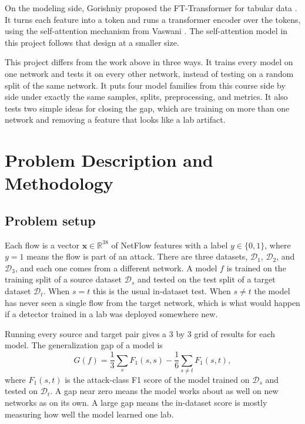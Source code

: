 On the modeling side, Gorishniy \etal proposed the FT-Transformer for tabular data \cite{gorishniy2021}. It turns each feature into a token and runs a transformer encoder over the tokens, using the self-attention mechanism from Vaswani \etal \cite{vaswani2017}. The self-attention model in this project follows that design at a smaller size.

This project differs from the work above in three ways. It trains every model on one network and tests it on every other network, instead of testing on a random split of the same network. It puts four model families from this course side by side under exactly the same samples, splits, preprocessing, and metrics. It also tests two simple ideas for closing the gap, which are training on more than one network and removing a feature that looks like a lab artifact.

\section{Problem Description and Methodology}
\label{sec:method}

\subsection{Problem setup}

Each flow is a vector $\mathbf{x} \in \mathbb{R}^{38}$ of NetFlow features with a label $y \in \{0, 1\}$, where $y = 1$ means the flow is part of an attack. There are three datasets, $\mathcal{D}_1$, $\mathcal{D}_2$, and $\mathcal{D}_3$, and each one comes from a different network. A model $f$ is trained on the training split of a source dataset $\mathcal{D}_s$ and tested on the test split of a target dataset $\mathcal{D}_t$. When $s = t$ this is the usual in-dataset test. When $s \neq t$ the model has never seen a single flow from the target network, which is what would happen if a detector trained in a lab was deployed somewhere new.

Running every source and target pair gives a 3 by 3 grid of results for each model. The generalization gap of a model is
\begin{equation}
G(f) = \frac{1}{3}\sum_{s} F_1(s, s) - \frac{1}{6}\sum_{s \neq t} F_1(s, t),
\end{equation}
where $F_1(s, t)$ is the attack-class F1 score of the model trained on $\mathcal{D}_s$ and tested on $\mathcal{D}_t$. A gap near zero means the model works about as well on new networks as on its own. A large gap means the in-dataset score is mostly measuring how well the model learned one lab.

